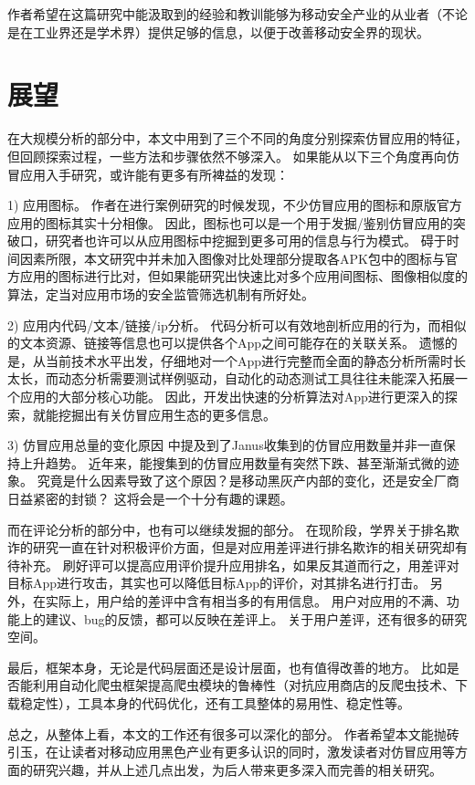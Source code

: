 作者希望在这篇研究中能汲取到的经验和教训能够为移动安全产业的从业者（不论是在工业界还是学术界）提供足够的信息，以便于改善移动安全界的现状。

\section{展望}

在大规模分析的部分中，本文中用到了三个不同的角度分别探索仿冒应用的特征，但回顾探索过程，一些方法和步骤依然不够深入。
如果能从以下三个角度再向仿冒应用入手研究，或许能有更多有所裨益的发现：

1) 应用图标。
作者在进行案例研究的时候发现，不少仿冒应用的图标和原版官方应用的图标其实十分相像。
因此，图标也可以是一个用于发掘/鉴别仿冒应用的突破口，研究者也许可以从应用图标中挖掘到更多可用的信息与行为模式。
碍于时间因素所限，本文研究中并未加入图像对比处理部分提取各APK包中的图标与官方应用的图标进行比对，但如果能研究出快速比对多个应用间图标、图像相似度的算法，定当对应用市场的安全监管筛选机制有所好处。

2) 应用内代码/文本/链接/ip分析。
代码分析可以有效地剖析应用的行为，而相似的文本资源、链接等信息也可以提供各个App之间可能存在的关联关系。
遗憾的是，从当前技术水平出发，仔细地对一个App进行完整而全面的静态分析所需时长太长，而动态分析需要测试样例驱动，自动化的动态测试工具往往未能深入拓展一个应用的大部分核心功能。
因此，开发出快速的分析算法对App进行更深入的探索，就能挖掘出有关仿冒应用生态的更多信息。

3) 仿冒应用总量的变化原因
中提及到了Janus收集到的仿冒应用数量并非一直保持上升趋势。
近年来，能搜集到的仿冒应用数量有突然下跌、甚至渐渐式微的迹象。
究竟是什么因素导致了这个原因？是移动黑灰产内部的变化，还是安全厂商日益紧密的封锁？
这将会是一个十分有趣的课题。

而在评论分析的部分中，也有可以继续发掘的部分。
在现阶段，学界关于排名欺诈的研究一直在针对积极评价方面，但是对应用差评进行排名欺诈的相关研究却有待补充。
刷好评可以提高应用评价提升应用排名，如果反其道而行之，用差评对目标App进行攻击，其实也可以降低目标App的评价，对其排名进行打击。
另外，在实际上，用户给的差评中含有相当多的有用信息。
用户对应用的不满、功能上的建议、bug的反馈，都可以反映在差评上。
关于用户差评，还有很多的研究空间。

最后，\mytool 框架本身，无论是代码层面还是设计层面，也有值得改善的地方。
比如是否能利用自动化爬虫框架提高爬虫模块的鲁棒性（对抗应用商店的反爬虫技术、下载稳定性），工具本身的代码优化，还有工具整体的易用性、稳定性等。

总之，从整体上看，本文的工作还有很多可以深化的部分。
作者希望本文能抛砖引玉，在让读者对移动应用黑色产业有更多认识的同时，激发读者对仿冒应用等方面的研究兴趣，并从上述几点出发，为后人带来更多深入而完善的相关研究。
